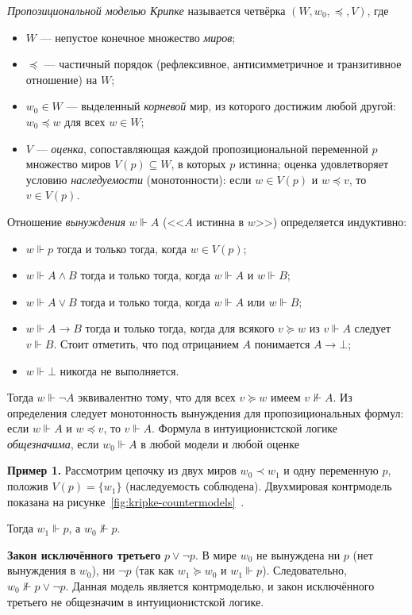 \documentclass[14pt, russian]{scrartcl}
\begin{document}
\emph{Пропозициональной моделью Крипке} называется четвёрка $(W, w_0, {\preceq}, V)$, где
\begin{itemize}
\item $W$ --- непустое конечное множество \emph{миров};
\item ${\preceq}$ --- частичный порядок (рефлексивное, антисимметричное и
  транзитивное отношение) на $W$;
\item $w_0 \in W$ --- выделенный \emph{корневой} мир, из которого достижим
  любой другой: $w_0 \preceq w$ для всех $w \in W$;
\item $V$ --- \emph{оценка}, сопоставляющая каждой пропозициональной переменной
  $p$ множество миров $V(p) \subseteq W$, в которых $p$ истинна; оценка
  удовлетворяет условию \emph{наследуемости} (монотонности): если $w \in V(p)$ и
  $w \preceq v$, то $v \in V(p)$.
\end{itemize} Отношение \emph{вынуждения} $w \Vdash A$
(<<$A$ истинна в $w$>>) определяется индуктивно:
\begin{itemize}
\item $w \Vdash p$ тогда и только тогда, когда $w \in V(p)$;
\item $w \Vdash A \land B$ тогда и только тогда, когда $w \Vdash A$ и $w \Vdash B$;
\item $w \Vdash A \lor B$ тогда и только тогда, когда $w \Vdash A$ или $w \Vdash B$;
\item $w \Vdash A \rightarrow B$ тогда и только тогда, когда для всякого $v \succeq w$ из $v \Vdash A$ следует $v \Vdash B$. Стоит отметить, что под отрицанием $A$ понимается $A \rightarrow \bot$;
\item $w \Vdash \bot$ никогда не выполняется.
\end{itemize}
Тогда $w \Vdash \neg A$ эквивалентно тому, что для всех $v \succeq w$ имеем $v
\not\Vdash A$. Из определения следует монотонность вынуждения для пропозициональных формул: если $w \Vdash A$
и $w \preceq v$, то $v \Vdash A$. Формула в интуиционистской логике
\emph{общезначима}, если $w_0 \Vdash A$ в любой модели и любой оценке

\textbf{Пример 1.} Рассмотрим цепочку из двух миров $w_0 \prec w_1$ и одну
переменную $p$, положив $V(p) = \{w_1\}$ (наследуемость соблюдена).
Двухмировая контрмодель показана на рисунке~\ref{fig:kripke-countermodels}~.

Тогда $w_1 \Vdash p$, а $w_0 \not\Vdash p$.

\textbf{Закон исключённого третьего} $p \lor \neg p$. В мире $w_0$ не вынуждена
ни $p$ (нет вынуждения в $w_0$), ни $\neg p$ (так как $w_1 \succeq w_0$ и $w_1
\Vdash p$). Следовательно, $w_0 \not\Vdash p \lor \neg p$. Данная модель
является контрмоделью, и закон исключённого третьего не общезначим в
интуиционистской логике.
\end{document}
